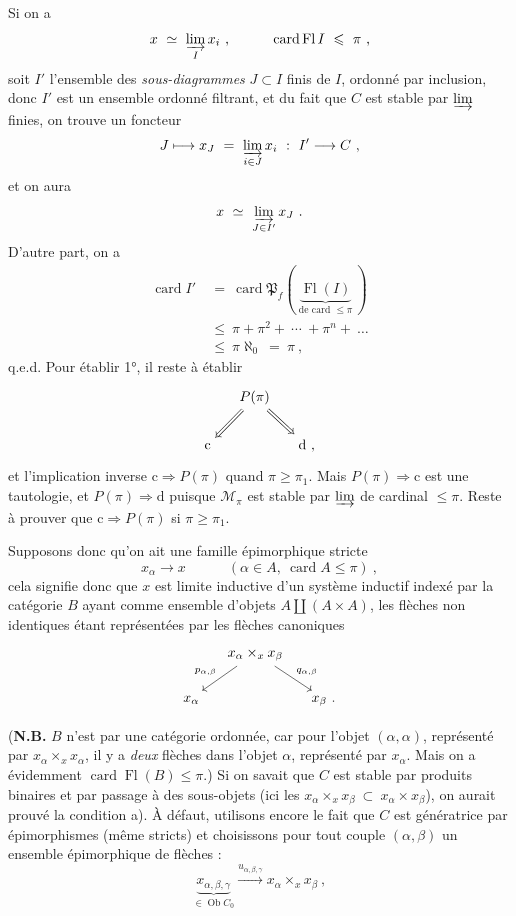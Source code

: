 \documentclass[11pt]{article}
\newcommand{\printedpage}[1]{\marginpar{\footnotesize p.~#1}}
\newcommand{\msp}[1]{\marginpar{\footnotesize [#1]}}
\newcommand{\card}{\operatorname{card}}
\newcommand{\Fl}{\operatorname{Fl}}
\newcommand{\Ob}{\operatorname{Ob}}
\begin{document}
\printedpage{40}

\msp{page 129}
Si on a
\[ x \ \simeq \ \varinjlim_{I} x_i \ , \qquad\quad \card \Fl I \ \leqslant \ \pi \ , \]
soit $I'$ l'ensemble des \textit{sous-diagrammes} $J \subset I$ finis de $I$, ordonné par inclusion, donc $I'$ est un ensemble ordonné filtrant, et du fait que $C$ est stable par $\varinjlim$ finies, on trouve un foncteur
\[ J \longmapsto x_J \ = \ \varinjlim_{i\in J} x_i \ : \ I' \longrightarrow C \ , \]
et on aura
\[ x \ \simeq \ \varinjlim_{J\in I'} x_J \ . \]
D'autre part, on a
\[
\begin{aligned}
\card I' \ &= \ \card \mathfrak{P}_f( \ \underbrace{\Fl(I)}_{\text{de card $\leqslant \pi$}} \ ) \\
&\leqslant \ \pi + \pi^2 + \ \cdots \ + \pi^n + \ \dots \\
&\leqslant \ \pi\aleph_0 \ = \ \pi \ ,
\end{aligned}
\]
q.e.d. Pour établir 1°, il reste à établir
\[
\begin{tikzcd}[column sep=small]
& P(\pi) \arrow[dl, Rightarrow] \arrow[dr, Rightarrow] & \\
\mathrm{c} & & \mathrm{d} \text{ ,}
\end{tikzcd}
\]
et l'implication inverse $\mathrm{c} \Longrightarrow P(\pi)$ quand $\pi \geqslant \pi_1$. Mais $P(\pi) \Longrightarrow \mathrm{c}$ est une tautologie, et $P(\pi) \Longrightarrow \mathrm{d}$ puisque $\mathcal{M}_{\pi}$ est stable par $\varinjlim$ de cardinal $\leqslant \pi$. Reste à prouver que $\mathrm{c} \Longrightarrow P(\pi)$ si $\pi \geqslant \pi_1$.

\msp{page 130}
Supposons donc qu'on ait une famille épimorphique stricte
\[ x_{\alpha} \longrightarrow x \qquad\quad (\alpha \in A,\ \card A \leqslant \pi) \ , \]
cela signifie donc que $x$ est limite inductive d'un système inductif indexé par la catégorie $B$ ayant comme ensemble d'objets $A \amalg (A\times A)$, les flèches non identiques étant représentées par les flèches canoniques
\[
\begin{tikzcd}[column sep=small]
& x_{\alpha} \times_x x_{\beta} \arrow[dl, "p_{\alpha,\beta}"'] \arrow[dr, "q_{\alpha,\beta}"] & \\
x_{\alpha} & & x_{\beta} \text{ .}
\end{tikzcd}
\]

(\textbf{N.B.} $B$ n'est par une catégorie ordonnée, car pour l'objet $(\alpha,\alpha)$, représenté par $x_{\alpha}\times_x x_{\alpha}$, %
il y a \textit{deux} flèches dans l'objet $\alpha$, représenté par $x_{\alpha}$. Mais on a évidemment $\card \Fl(B) \leqslant \pi$.) Si on savait que $C$ est stable par produits binaires et par passage à des sous-objets (ici les $x_{\alpha} \times_x x_{\beta} \ \subset \ x_{\alpha} \times x_{\beta}$), on aurait prouvé la condition a). À défaut, utilisons encore le fait que $C$ est génératrice par épimorphismes (même stricts) et choisissons pour tout couple $(\alpha,\beta)$ un ensemble épimorphique de flèches :
\[ \underbrace{x_{\alpha,\beta,\gamma}}_{\in \Ob C_0} \xrightarrow{u_{\alpha,\beta,\gamma}} x_{\alpha} \times_x x_{\beta} \ , \]
\end{document}
